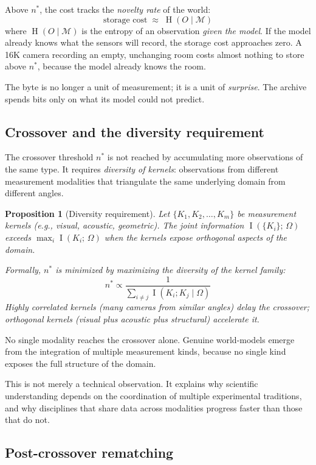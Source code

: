 \documentclass[11pt, a4paper]{article}
\theoremstyle{plain}
\newtheorem{proposition}[theorem]{Proposition}
\theoremstyle{definition}
\theoremstyle{remark}
\newcommand{\Mod}{\mathcal{M}}
\newcommand{\nstar}{n^{*}}
\DeclareMathOperator{\Hent}{H}
\DeclareMathOperator{\Info}{I}
\begin{document}
Above $\nstar$, the cost tracks the \emph{novelty rate} of the world:
\[
  \text{storage cost} \;\approx\; \Hent(O \mid \Mod)
\]
where $\Hent(O \mid \Mod)$ is the entropy of an observation
\emph{given the model}. If the model already knows what the
sensors will record, the storage cost approaches zero.
A 16K camera recording an empty, unchanging room costs almost
nothing to store above $\nstar$, because the model already
knows the room.

The byte is no longer a unit of measurement; it is a unit of
\emph{surprise}. The archive spends bits only on what its
model could not predict.

\subsection{Crossover and the diversity requirement}

The crossover threshold $\nstar$ is not reached by accumulating
more observations of the same type. It requires \emph{diversity
of kernels}: observations from different measurement modalities
that triangulate the same underlying domain from different angles.

\begin{proposition}[Diversity requirement]
\label{prop:diversity}
Let $\{K_1, K_2, \ldots, K_m\}$ be measurement kernels
(e.g., visual, acoustic, geometric).
The joint information $\Info(\{K_i\};\, \Omega)$ exceeds
$\max_i \Info(K_i;\, \Omega)$ when the kernels expose
orthogonal aspects of the domain.

Formally, $\nstar$ is minimized by maximizing the diversity
of the kernel family:
\[
  \nstar \propto \frac{1}{\sum_{i \neq j} \Info(K_i; K_j \mid \Omega)}
\]
Highly correlated kernels (many cameras from similar angles)
delay the crossover; orthogonal kernels (visual plus acoustic
plus structural) accelerate it.
\end{proposition}

No single modality reaches the crossover alone. Genuine world-models
emerge from the integration of multiple measurement kinds, because
no single kind exposes the full structure of the domain.

This is not merely a technical observation. It explains why
scientific understanding depends on the coordination of multiple
experimental traditions, and why disciplines that share data
across modalities progress faster than those that do not.

\subsection{Post-crossover rematching}
\end{document}
